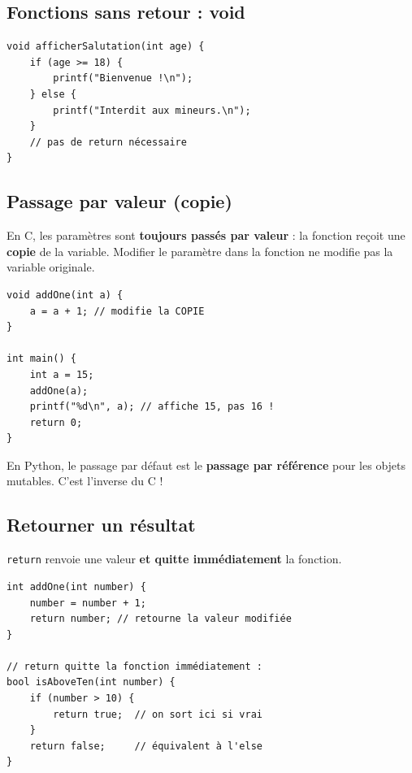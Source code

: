 \documentclass[12pt,a4paper]{article}
\begin{document}
\subsection{Fonctions sans retour : void}

\begin{lstlisting}[caption={Fonction void}]
void afficherSalutation(int age) {
    if (age >= 18) {
        printf("Bienvenue !\n");
    } else {
        printf("Interdit aux mineurs.\n");
    }
    // pas de return nécessaire
}
\end{lstlisting}

\subsection{Passage par valeur (copie)}

En C, les paramètres sont \textbf{toujours passés par valeur} : la fonction reçoit une \textbf{copie} de la variable. Modifier le paramètre dans la fonction ne modifie pas la variable originale.

\begin{lstlisting}[caption={Passage par valeur — la variable originale n'est pas modifiée}]
void addOne(int a) {
    a = a + 1; // modifie la COPIE
}

int main() {
    int a = 15;
    addOne(a);
    printf("%d\n", a); // affiche 15, pas 16 !
    return 0;
}
\end{lstlisting}

\begin{important}
En Python, le passage par défaut est le \textbf{passage par référence} pour les objets mutables. C'est l'inverse du C !
\end{important}

\subsection{Retourner un résultat}

\texttt{return} renvoie une valeur \textbf{et quitte immédiatement} la fonction.

\begin{lstlisting}[caption={Retour de valeur et return early}]
int addOne(int number) {
    number = number + 1;
    return number; // retourne la valeur modifiée
}

// return quitte la fonction immédiatement :
bool isAboveTen(int number) {
    if (number > 10) {
        return true;  // on sort ici si vrai
    }
    return false;     // équivalent à l'else
}
\end{lstlisting}
\end{document}
